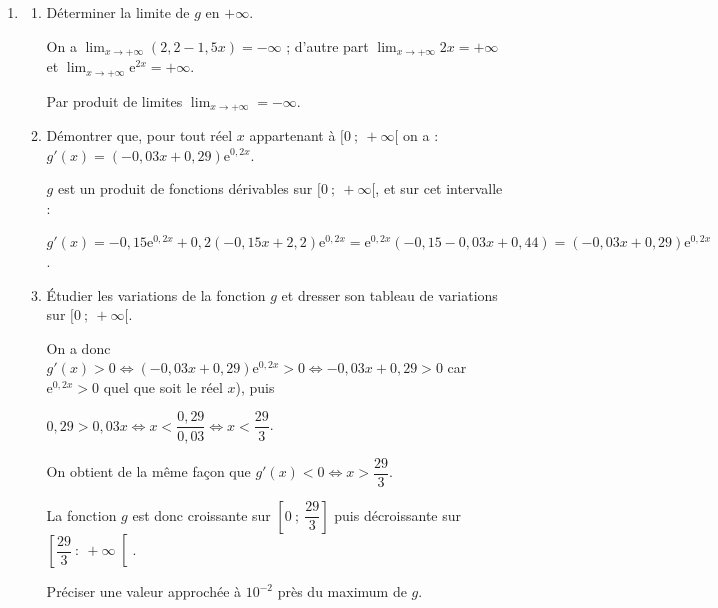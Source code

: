 \begin{enumerate}
\begin{enumerate}
De même $f'(x) < 0 \iff x > 6,85$.

La fonction $f$ est donc croissante sur $[0~;~6,85]$ et décroissante sur $[6,85~;~+ \infty[$.
		\item Résoudre l'équation $f(x) = 0$.
		
$f(x) = 0 \iff 0,06\left(-x^2 +13,7x\right) = 0 \iff -x^2 + 13,7x = 0 \iff x(13,7 - x) = 0\iff \left\{\begin{array}{l c l}
x&=&0\\
13,7&=&x
\end{array}\right>.$

On a donc $S = \{0~;~13,7\}$.
\end{enumerate}
\item 
	\begin{enumerate}
		\item Déterminer la limite de $g$ en $+\infty$.
		
On a $\displaystyle\lim_{x \to + \infty} (2,2 - 1,5x) = - \infty$ ; d'autre part $\displaystyle\lim_{x \to + \infty} 2x = + \infty$ et $\displaystyle\lim_{x \to + \infty} \text{e}^{2x} = + \infty$.

Par produit de limites $\displaystyle\lim_{x \to + \infty} = - \infty$.
		\item Démontrer que, pour tout réel $x$ appartenant à $[0~;~+\infty[$ on a : $g'(x) = (- 0,03x + 0,29)\text{e}^{0,2x}$.
		
$g$ est un produit de fonctions dérivables sur $[0~;~+ \infty[$, et sur cet intervalle :
		
$g'(x) = - 0,15 \text{e}^{0,2x} + 0,2(-0,15x + 2,2)\text{e}^{0,2x} = \text{e}^{0,2x}(- 0,15 - 0,03x + 0,44) = (- 0,03x + 0,29)\text{e}^{0,2x}$.
		\item Étudier les variations de la fonction $g$ et dresser son tableau de variations sur $[0~;~+\infty[$.
		
On a donc $g'(x) > 0 \iff (- 0,03x + 0,29)\text{e}^{0,2x} > 0 \iff - 0,03x + 0,29 > 0$ car $\text{e}^{0,2x} > 0$ quel que soit le réel $x$), puis 

$0,29 > 0,03x \iff x < \dfrac{0,29}{0,03} \iff x < \dfrac{29}{3}$.

On obtient de la même façon que $g'(x) < 0 \iff x > \dfrac{29}{3}$.

La fonction $g$ est donc croissante sur $\left[0~;~\dfrac{29}{3}\right]$ puis décroissante sur $\left[\dfrac{29}{3}~:~+ \infty\right[$.

Préciser une valeur approchée à $10^{-2}$ près du maximum de $g$.


\end{enumerate}
\end{enumerate}
